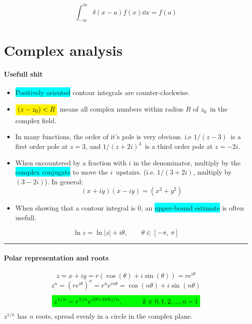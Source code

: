 \documentclass[10pt,a4paper]{article}
\renewcommand{\exp}{e^}
\newcommand{\infint}{\int_{-\infty}^{\infty}}
\newcommand{\holine}{\rule{286pt}{1pt}}
\newcommand{\yl}[1]{\colorbox{yellow}{$\displaystyle #1$}}
\newcommand{\gr}[1]{\colorbox{green}{$\displaystyle #1$}}
\newcommand{\bll}{\colorbox{cyan}}
\begin{document}
\begin{multicols}{2}
\[
    \infint \delta(x-a)f(x)\dd{x} = f(a)
\]







\newpage
\part*{Complex analysis}
\subsection*{Usefull shit}

\begin{itemize}
    \item \bll{Positively oriented} contour integrals are counter-clockwise.
    \item $\yl{(z-z_0)<R}$ means all complex numbers within radius $R$ of $z_0$ in the complex field.
    \item In many functions, the order of it's pole is very obvious. i.e $1/(z-3)$ is a first order pole at $z=3$, and $1/(z+2i)^3$ is a third order pole at $z=-2i$.
    \item When encountered by a fraction with $i$ in the denominator, multiply by the \bll{complex conjugate} to move the $i$ upstairs. (i.e. $1/(3+2i)$, multiply by $(3-2i)$). In general:
    \[
        (x+iy)(x-iy) = (x^2 + y^2)
    \]
    \item When showing that a contour integral is 0, an \bll{upper-bound estimate} is often usefull.
\end{itemize}

\[
    \ln{z} = \ln|z| + i\theta, \quad\quad \theta\in[-\pi,\, \pi]
\]



\holine
\subsection*{Polar representation and roots}
\[
    z = x + iy = r(\cos(\theta) + i\sin(\theta)) = r\exp{i\theta}
\]
\[
    z^n = (r\exp{i\theta})^n = r^n\exp{in\theta} = \cos(n\theta) + i \sin(n\theta)
\]
\[\gr{
    z^{1/n} = r^{1/n}\exp{i(\theta + 2\pi k)/n}, \quad\quad\quad k\in 0,1,2,...,n-1
}\]
$z^{1/n}$ has $n$ roots, spread evenly in a circle in the complex plane.




\end{multicols}
\end{document}
